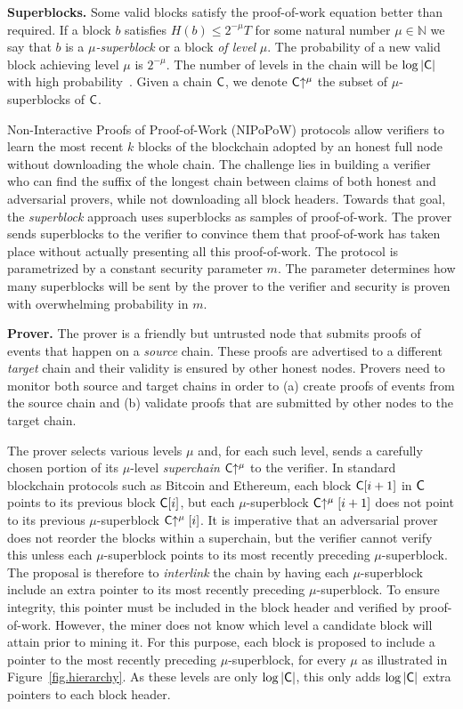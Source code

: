 \noindent
\textbf{Superblocks.}
Some valid blocks satisfy the proof-of-work equation better than required. If
a block $b$ satisfies $H(b) \leq 2^{-\mu} T$ for some natural number
$\mu \in \mathbb{N}$ we say that $b$ is a \emph{$\mu$-superblock} or a block
\emph{of level} $\mu$. The probability of a new valid block achieving level
$\mu$ is $2^{-\mu}$. The number of levels in the chain will be $\log|\mathsf{C}|$
with high probability~\cite{popow}. Given a chain $\mathsf{C}$, we denote
$\mathsf{C}\negthickspace\uparrow^\mu$ the subset of $\mu$-superblocks of $\mathsf{C}$.

Non-Interactive Proofs of Proof-of-Work (NIPoPoW) protocols allow verifiers to
learn the most recent $k$ blocks of the blockchain adopted by an honest full
node without downloading the whole chain. The challenge lies in building a
verifier who can find the suffix of the longest chain between claims of both
honest and adversarial provers, while not downloading all block headers. Towards
that goal, the \emph{superblock} approach uses superblocks as samples of
proof-of-work. The prover sends superblocks to the verifier to convince them
that proof-of-work has taken place without actually presenting all this
proof-of-work. The protocol is parametrized by a constant security parameter
$m$. The parameter determines how many superblocks will be sent by the prover to
the verifier and security is proven with overwhelming probability in $m$.

\noindent \textbf{Prover.} The prover is a friendly but untrusted node that
submits proofs of events that happen on a \emph{source} chain. These proofs are
advertised to a different \emph{target} chain and their validity is ensured by
other honest nodes. Provers need to monitor both source and target chains in
order to (a) create proofs of events from the source chain and (b) validate
proofs that are submitted by other nodes to the target chain.

The prover selects various levels $\mu$ and, for each
such level, sends a carefully chosen portion of its $\mu$-level
\emph{superchain} $\mathsf{C}\negthickspace\uparrow^\mu$ to the verifier. In standard blockchain
protocols such as Bitcoin and Ethereum, each block $\mathsf{C}[i + 1]$ in $\mathsf{C}$
points to its previous block $\mathsf{C}[i]$, but each $\mu$-superblock
$\mathsf{C}\negthickspace\uparrow^\mu[i + 1]$ does not point to its previous $\mu$-superblock
$\mathsf{C}\negthickspace\uparrow^\mu[i]$. It is imperative that an adversarial prover does not
reorder the blocks within a superchain, but the verifier cannot verify this
unless each $\mu$-superblock points to its most recently preceding
$\mu$-superblock. The proposal is therefore to \emph{interlink} the chain by
having each $\mu$-superblock include an extra pointer to its most recently
preceding $\mu$-superblock. To ensure integrity, this pointer must be included
in the block header and verified by proof-of-work. However, the miner does not
know which level a candidate block will attain prior to mining it. For this
purpose, each block is proposed to include a pointer to the most recently
preceding $\mu$-superblock, for every $\mu$
as illustrated in Figure~\ref{fig.hierarchy}.
As these levels are only $\log|\mathsf{C}|$, this only adds $\log|\mathsf{C}|$ extra
pointers to each block header.

